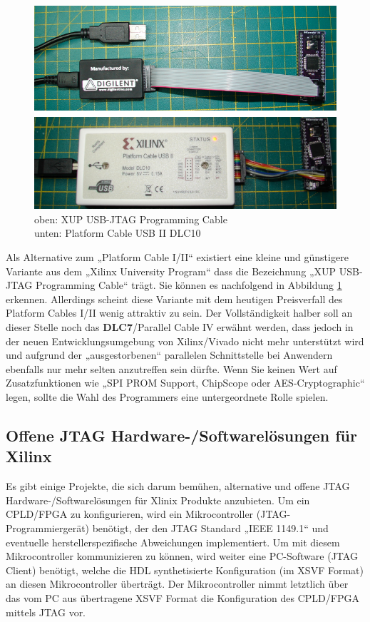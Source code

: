 \documentclass{article}
\begin{document}
{\begin{figure}[!h]
	\centering
	\includegraphics[width=1\linewidth]{Figures/JTAG_Programmer_uebersicht}
	\caption{oben: XUP USB-JTAG Programming Cable
		\\\hspace*{2cm} unten: Platform Cable USB II DLC10}
	\label{fig:JTAG_Cable}
\end{figure}

Als Alternative zum „Platform Cable I/II“ existiert eine kleine und günstigere Variante aus dem „Xilinx University Program“ dass die Bezeichnung „XUP USB-JTAG Programming Cable“ trägt. Sie können es nachfolgend in Abbildung \ref{fig:JTAG_Cable} erkennen. Allerdings scheint diese Variante mit dem heutigen Preisverfall des Platform Cables I/II wenig attraktiv zu sein. 
Der Vollständigkeit halber soll an dieser Stelle noch das \textbf{DLC7}/Parallel Cable IV erwähnt werden, dass jedoch in der neuen Entwicklungsumgebung von Xilinx/Vivado nicht mehr unterstützt wird \autocite{AR_54136} und aufgrund der „ausgestorbenen“ parallelen Schnittstelle bei Anwendern ebenfalls nur mehr selten anzutreffen sein dürfte. Wenn Sie keinen Wert auf Zusatzfunktionen wie „SPI PROM Support, ChipScope oder AES-Cryptographic“ legen, sollte die Wahl des Programmers eine untergeordnete Rolle spielen.

\newpage

\subsection{Offene JTAG Hardware-/Softwarelösungen für Xilinx}
Es gibt einige Projekte, die sich darum bemühen, alternative und offene JTAG Hardware-/Softwarelösungen für Xlinix Produkte anzubieten.
Um ein CPLD/FPGA zu konfigurieren, wird ein Mikrocontroller (JTAG-Programmiergerät) benötigt, der den JTAG Standard „IEEE 1149.1“ und eventuelle herstellerspezifische Abweichungen implementiert. 
Um mit diesem Mikrocontroller kommunizieren zu können, wird weiter eine PC-Software (JTAG Client) benötigt, welche die HDL synthetisierte Konfiguration (im XSVF Format) an diesen Mikrocontroller überträgt. Der Mikrocontroller nimmt letztlich über das vom PC aus übertragene XSVF Format die Konfiguration des CPLD/FPGA mittels JTAG vor.

}
\end{document}
